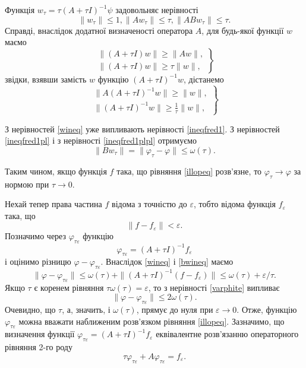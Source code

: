 \documentclass[14pt,twoside]{extreport}
\theoremstyle{mystyle}
\numberwithin{equation}{chapter}
\begin{document}
Функція $w_{\tau} = \tau (A + \tau I)^{-1} \psi$ задовольняє нерівності
\begin{equation}\label{ineqfred1}
 \|w_{\tau}\| \leqslant 1, \|A w_{\tau} \| \leqslant \tau, \|AB w_{\tau}\| \leqslant \tau.
\end{equation}
Справді, внаслідок додатної визначеності оператора $A$, для будь-якої функції $w$ маємо
\begin{equation}\label{ineqfred1pl}
 \left.
 \begin{array}{r}
  \|(A + \tau I) w\| \geqslant \|Aw\|,\\
  \|(A + \tau I) w\| \geqslant \tau \|w\|,
 \end{array}
 \right\}
\end{equation}
звідки, взявши замість $w$ функцію $(A + \tau I)^{-1} w$, дістанемо
\begin{equation}\label{wineq}
 \left.
 \begin{array}{r}
  \|A(A + \tau I)^{-1} w\| \geqslant \|w\|,\\
  \|(A + \tau I)^{-1} w\| \geqslant \frac{1}{\tau} \|w\|,
 \end{array}
 \right\}
\end{equation}

З нерівностей \eqref{wineq} уже випливають нерівності \eqref{ineqfred1}. З нерівностей \eqref{ineqfred1pl} і з нерівності \eqref{ineqfred1plpl} отримуємо
\begin{equation}\label{bwineq}
 \|B w_{\tau} \| = \|\varphi_{\tau} - \varphi \| \leqslant \omega(\tau).
\end{equation}

Таким чином, якщо функція $f$ така, що рівняння \eqref{illopeq} розв'язне, то $\varphi_{\tau} \to \varphi$ за нормою при $\tau \to 0$.

Нехай тепер права частина $f$ відома з точністю до $\varepsilon$, тобто відома функція $f_{\varepsilon}$ така, що
\[
 \|f - f_{\varepsilon}\| < \varepsilon.
\]
Позначимо через $\varphi_{\tau\varepsilon}$ функцію
\[
 \varphi_{\tau\varepsilon} = (A + \tau I)^{-1} f_{\varepsilon}
\]
і оцінимо різницю $\varphi - \varphi_{\tau\varepsilon}$. Внаслідок \eqref{wineq} і \eqref{bwineq} маємо
\begin{equation}\label{varphite}
 \|\varphi - \varphi_{\tau\varepsilon} \| \leqslant \omega(\tau) + \|(A+\tau I)^{-1} (f - f_{\varepsilon})\| \leqslant \omega(\tau) + \varepsilon/\tau.
\end{equation}
Якщо $\tau$ є коренем рівняння $\tau \omega(\tau) = \varepsilon$, то з нерівності \eqref{varphite} випливає
\[
 \|\varphi - \varphi_{\tau\varepsilon}\| \leqslant 2 \omega(\tau).
\]
Очевидно, що $\tau$, а, значить, і $\omega(\tau)$, прямує до нуля при $\varepsilon \to 0$. Отже, функцію $\varphi_{\tau\varepsilon}$ можна вважати наближеним розв'язком рівняння \eqref{illopeq}. Зазначимо, що визначення функції $\varphi_{\tau\varepsilon} = (A + \tau I)^{-1}f_{\varepsilon}$ еквівалентне розв'язанню операторного рівняння 2-го роду
\[
 \tau \varphi_{\tau\varepsilon} + A\varphi_{\tau\varepsilon} = f_{\varepsilon}.
\]
\end{document}
